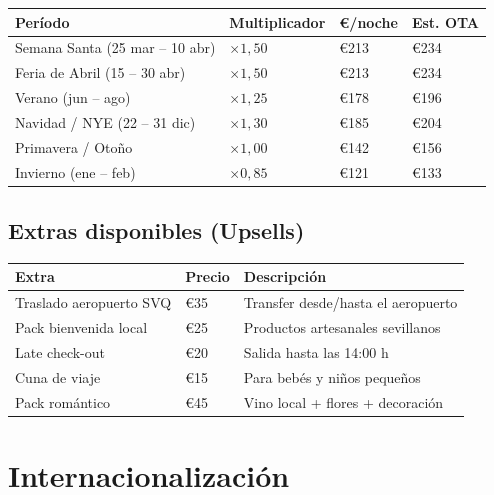 \documentclass[12pt,a4paper,twoside,openright]{report}
\begin{document}
\begin{longtable}{L{6.5cm} C{2.5cm} R{2cm} R{2cm}}
  \toprule
  \textbf{Período} & \textbf{Multiplicador} & \textbf{€/noche} & \textbf{Est. OTA} \\
  \midrule
  Semana Santa (25 mar -- 10 abr) & $\times 1{,}50$ & \euro{}213 & \euro{}234 \\
  Feria de Abril (15 -- 30 abr)   & $\times 1{,}50$ & \euro{}213 & \euro{}234 \\
  Verano (jun -- ago)             & $\times 1{,}25$ & \euro{}178 & \euro{}196 \\
  Navidad / NYE (22 -- 31 dic)    & $\times 1{,}30$ & \euro{}185 & \euro{}204 \\
  Primavera / Otoño               & $\times 1{,}00$ & \euro{}142 & \euro{}156 \\
  Invierno (ene -- feb)           & $\times 0{,}85$ & \euro{}121 & \euro{}133 \\
  \bottomrule
\end{longtable}

\section{Extras disponibles (Upsells)}

\begin{longtable}{L{4.5cm} C{1.8cm} L{6cm}}
  \toprule
  \textbf{Extra} & \textbf{Precio} & \textbf{Descripción} \\
  \midrule
  Traslado aeropuerto SVQ & \euro{}35 & Transfer desde/hasta el aeropuerto \\
  Pack bienvenida local   & \euro{}25 & Productos artesanales sevillanos \\
  Late check-out          & \euro{}20 & Salida hasta las 14:00 h \\
  Cuna de viaje           & \euro{}15 & Para bebés y niños pequeños \\
  Pack romántico          & \euro{}45 & Vino local + flores + decoración \\
  \bottomrule
\end{longtable}

\chapter{Internacionalización}
\end{document}
